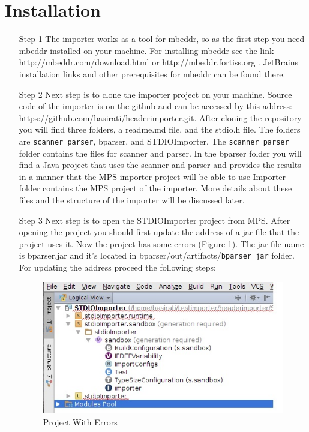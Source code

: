 \documentclass{article}
\begin{document}
\section{Installation}
\begin{itemize}
\item[Step 1]
The importer works as a tool for mbeddr, so as the first step you need mbeddr installed on your machine. For installing mbeddr see the link http://mbeddr.com/download.html or http://mbeddr.fortiss.org . JetBrains installation links and other prerequisites for mbeddr can be found there.
\item[Step 2]
Next step is to clone the importer project on your machine. Source code of the importer is on the github and can be accessed by this address: https://github.com/basirati/headerimporter.git. After cloning the repository you will find three folders, a readme.md file, and the stdio.h file. The folders are \texttt{scanner\_parser}, bparser, and STDIOImporter. The \texttt{scanner\_parser} folder contains the files for scanner and parser. In the bparser folder you will find a Java project that uses the scanner and parser and provides the results in a manner that the MPS importer project will be able to use Importer folder contains the MPS project of the importer. More details about these files and the structure of the importer will be discussed later.
\item[Step 3]
Next step is to open the STDIOImporter project from MPS. After opening the project you should first update the address of a jar file that the project uses it. Now the project has some errors (Figure 1). The jar file name is bparser.jar and it's located in bparser/out/artifacts/\texttt{bparser\_jar} folder. For updating the address proceed the following steps:

\begin{figure}[h]
\caption{Project With Errors}
\centering
\includegraphics[scale=1]{errscreen.jpg}
\end{figure}


\end{itemize}
\end{document}
